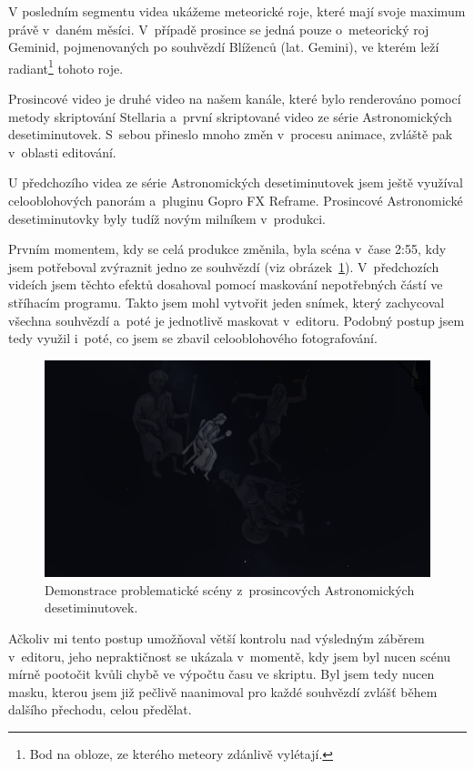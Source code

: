 \documentclass[12pt,a4paper,titlepage]{article}
\begin{document}
V posledním segmentu videa ukážeme meteorické roje, které mají svoje maximum právě v~daném měsíci. V~případě prosince se jedná pouze o~meteorický roj Geminid, pojmenovaných po souhvězdí Blíženců (lat. Gemini), ve kterém leží radiant\footnote{Bod na obloze, ze kterého meteory zdánlivě vylétají.} tohoto roje.

Prosincové video je druhé video na našem kanále, které bylo renderováno pomocí metody skriptování Stellaria a~první skriptované video ze série Astronomických desetiminutovek. S~sebou přineslo mnoho změn v~procesu animace, zvláště pak v~oblasti editování. 

U předchozího videa ze série Astronomických desetiminutovek jsem ještě využíval celooblohových panorám a~pluginu Gopro FX Reframe. Prosincové Astronomické desetiminutovky byly tudíž novým milníkem v~produkci.

Prvním momentem, kdy se celá produkce změnila, byla scéna v~čase 2:55, kdy jsem potřeboval zvýraznit jedno ze souhvězdí (viz obrázek~\ref{prac:ac12_1}). V~předchozích videích jsem těchto efektů dosahoval pomocí maskování nepotřebných částí ve stříhacím programu. Takto jsem mohl vytvořit jeden snímek, který zachycoval všechna souhvězdí a~poté je jednotlivě maskovat v~editoru. Podobný postup jsem tedy využil i~poté, co jsem se zbavil celooblohového fotografování.

\begin{figure}[H]
	\centering
	\includegraphics[width=.95\textwidth]{ac12_1.png}
	\caption{Demonstrace problematické scény z~prosincových Astronomických desetiminutovek.}\label{prac:ac12_1}
\end{figure}

Ačkoliv mi tento postup umožňoval větší kontrolu nad výsledným záběrem v~editoru, jeho nepraktičnost se ukázala v~momentě, kdy jsem byl nucen scénu mírně pootočit kvůli chybě ve výpočtu času ve skriptu. Byl jsem tedy nucen masku, kterou jsem již pečlivě naanimoval pro každé souhvězdí zvlášť během dalšího přechodu, celou předělat.
\end{document}
